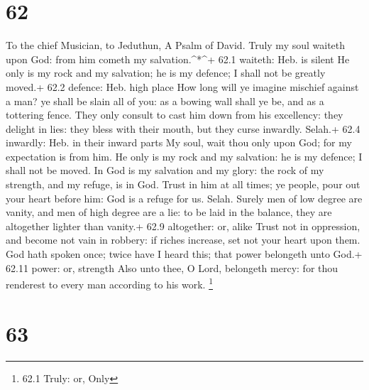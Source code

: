 \hypertarget{section-61}{%
\section{62}\label{section-61}}

To the chief Musician, to Jeduthun, A Psalm of David.  Truly
my soul waiteth upon God: from him cometh my salvation.\^{}*\^{}+ 62.1
waiteth: Heb. is silent  He only is my rock and my
salvation; he is my defence; I shall not be greatly moved.+ 62.2
defence: Heb. high place  How long will ye imagine mischief
against a man? ye shall be slain all of you: as a bowing wall shall ye
be, and as a tottering fence.  They only consult to cast him
down from his excellency: they delight in lies: they bless with their
mouth, but they curse inwardly. Selah.+ 62.4 inwardly: Heb. in their
inward parts  My soul, wait thou only upon God; for my
expectation is from him.  He only is my rock and my
salvation: he is my defence; I shall not be moved.  In God
is my salvation and my glory: the rock of my strength, and my refuge, is
in God.  Trust in him at all times; ye people, pour out your
heart before him: God is a refuge for us. Selah.  Surely men
of low degree are vanity, and men of high degree are a lie: to be laid
in the balance, they are altogether lighter than vanity.+ 62.9
altogether: or, alike  Trust not in oppression, and become
not vain in robbery: if riches increase, set not your heart upon them.
 God hath spoken once; twice have I heard this; that power
belongeth unto God.+ 62.11 power: or, strength  Also unto
thee, O Lord, belongeth mercy: for thou renderest to every man according
to his work. \footnote{62.1 Truly: or, Only}

\hypertarget{section-62}{%
\section{63}\label{section-62}}

